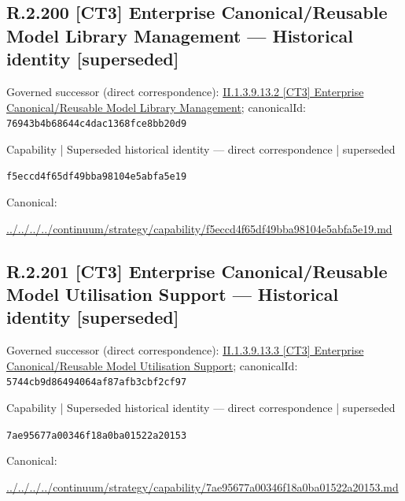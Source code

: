 \documentclass[10pt,a4paper]{article}
\begin{document}
\subsection*{R.2.200 [CT3] Enterprise Canonical/Reusable Model Library Management — Historical identity [superseded]}
Governed successor (direct correspondence): \hyperref[element-76943b4b68644c4dac1368fce8bb20d9]{II.1.3.9.13.2 [CT3] Enterprise Canonical/Reusable Model Library Management}; canonicalId: \texttt{76943b4b68644c4dac1368fce8bb20d9}\par
\label{element-f5eccd4f65df49bba98104e5abfa5e19}
{\small Capability | Superseded historical identity — direct correspondence | superseded}\par
\texttt{f5eccd4f65df49bba98104e5abfa5e19}\par
Canonical: \par
{\footnotesize\url{../../../../continuum/strategy/capability/f5eccd4f65df49bba98104e5abfa5e19.md}}\par
\subsection*{R.2.201 [CT3] Enterprise Canonical/Reusable Model Utilisation Support — Historical identity [superseded]}
Governed successor (direct correspondence): \hyperref[element-5744cb9d86494064af87afb3cbf2cf97]{II.1.3.9.13.3 [CT3] Enterprise Canonical/Reusable Model Utilisation Support}; canonicalId: \texttt{5744cb9d86494064af87afb3cbf2cf97}\par
\label{element-7ae95677a00346f18a0ba01522a20153}
{\small Capability | Superseded historical identity — direct correspondence | superseded}\par
\texttt{7ae95677a00346f18a0ba01522a20153}\par
Canonical: \par
{\footnotesize\url{../../../../continuum/strategy/capability/7ae95677a00346f18a0ba01522a20153.md}}\par
\end{document}
